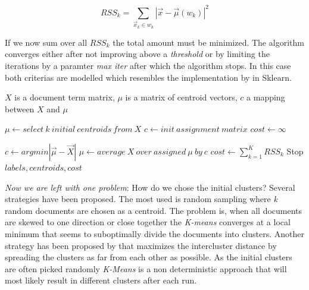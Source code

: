       \begin{equation}
        RSS_k = \sum_{\vec{x}_k \in \textit{w}_k}|\vec{x} - \vec{\mu}(\textit{w}_k)|^{2}
      \end{equation}

    If we now sum over all $RSS_k$ the total amount must be minimized. The algorithm converges either after not improving above a \emph{threshold} or by limiting the iterations by a paramter \emph{max iter} after which the algorithm stops. In this case both criterias are modelled which resembles the implementation by \cite{ScikitLearn} in Sklearn.

    \begin{algorithm}[H]
    \begin{algorithmic}[1]
      \caption{$X$ is a document term matrix, $\mu$ is a matrix of centroid vectors, $c$ a mapping between $X$ and $\mu$}\label{kmeans}
        \State $\mu \gets select\:k\:initial\:centroids\:from\:X$
        \State $c \gets init\:assignment\:matrix {}$
        \State $cost \gets \infty$

          \State $c \gets argmin|\vec{\mu} - \vec{X}|$ 
          \State $\mu \gets average\:X\:over\:assigned\:\mu\:by\:c$
          \State $cost \gets \sum_{k = 1}^{K}RSS_k$
            \State Stop
          \EndIf
        \EndFor
        \State \Return $labels, centroids, cost$
      \EndFunction
    \end{algorithmic}
    \end{algorithm}

    \emph{Now we are left with one problem}: How do we chose the initial clusters? Several strategies have been proposed. The most used is random sampling where \emph{k} random documents are chosen as a centroid. The problem is, when all documents are skewed to one direction or close together the \emph{K-means} converges at a local minimum that seems to suboptimally divide the documents into clusters.
    Another strategy has been proposed by \cite{KMeansPlusPlus2007} that maximizes the intercluster distance by spreading the clusters as far from each other as possible. 
    As the initial clusters are often picked randomly \emph{K-Means} is a non deterministic approach that will most likely result in different clusters after each run.


